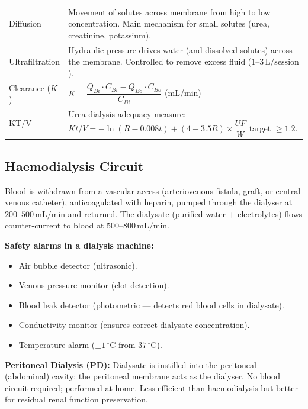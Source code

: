 \documentclass[12pt,a4paper]{article}
\renewcommand{\arraystretch}{1.45}
\begin{document}
\begin{tcolorbox}[formulabox, title={\textbf{Mass Transport Mechanisms in Haemodialysis}}]
\renewcommand{\arraystretch}{1.3}
\begin{tabularx}{\linewidth}{B{3.2cm} X}
Diffusion & Movement of solutes across membrane from high to low concentration. Main mechanism for small solutes (urea, creatinine, potassium). \\[4pt]
Ultrafiltration & Hydraulic pressure drives water (and dissolved solutes) across the membrane. Controlled to remove excess fluid ($1$--$3\,\text{L/session}$). \\[4pt]
Clearance ($K$) & $K = \dfrac{Q_{Bi} \cdot C_{Bi} - Q_{Bo} \cdot C_{Bo}}{C_{Bi}}$ \quad (mL/min) \\[8pt]
KT/V & Urea dialysis adequacy measure: $Kt/V = -\ln(R - 0.008t) + (4-3.5R)\times\dfrac{UF}{W}$ \quad target $\geq 1.2$.
\end{tabularx}
\end{tcolorbox}

\subsection{Haemodialysis Circuit}

Blood is withdrawn from a vascular access (arteriovenous fistula, graft, or central venous catheter), anticoagulated with heparin, pumped through the dialyser at $200$--$500\,\text{mL/min}$ and returned. The dialysate (purified water + electrolytes) flows counter-current to blood at $500$--$800\,\text{mL/min}$.

\textbf{Safety alarms in a dialysis machine:}
\begin{itemize}[leftmargin=*, itemsep=2pt]
  \item Air bubble detector (ultrasonic).
  \item Venous pressure monitor (clot detection).
  \item Blood leak detector (photometric --- detects red blood cells in dialysate).
  \item Conductivity monitor (ensures correct dialysate concentration).
  \item Temperature alarm ($\pm 1\,^{\circ}$C from $37\,^{\circ}$C).
\end{itemize}

\textbf{Peritoneal Dialysis (PD):} Dialysate is instilled into the peritoneal (abdominal) cavity; the peritoneal membrane acts as the dialyser. No blood circuit required; performed at home. Less efficient than haemodialysis but better for residual renal function preservation.
\end{document}
